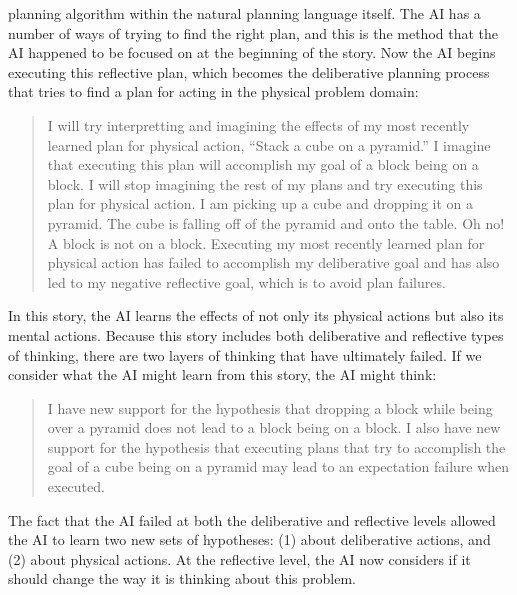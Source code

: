 planning algorithm within the natural planning language itself.  The
AI has a number of ways of trying to find the right plan, and this is
the method that the AI happened to be focused on at the beginning of
the story.  Now the AI begins executing this reflective plan, which
becomes the deliberative planning process that tries to find a plan
for acting in the physical problem domain:
\begin{quote}
  I will try interpretting and imagining the effects of my most
  recently learned plan for physical action, ``Stack a cube on a
  pyramid.''  I imagine that executing this plan will accomplish my
  goal of a block being on a block.  I will stop imagining the rest of
  my plans and try executing this plan for physical action.  I am
  picking up a cube and dropping it on a pyramid.  The cube is falling
  off of the pyramid and onto the table.  Oh no!  A block is not on a
  block.  Executing my most recently learned plan for physical action
  has failed to accomplish my deliberative goal and has also led to my
  negative reflective goal, which is to avoid plan failures.
\end{quote}
In this story, the AI learns the effects of not only its physical
actions but also its mental actions.  Because this story includes both
deliberative and reflective types of thinking, there are two layers of
thinking that have ultimately failed.  If we consider what the AI
might learn from this story, the AI might think:
\begin{quote}
  I have new support for the hypothesis that dropping a block while
  being over a pyramid does not lead to a block being on a block.  I
  also have new support for the hypothesis that executing plans that
  try to accomplish the goal of a cube being on a pyramid may lead to
  an expectation failure when executed.
\end{quote}
The fact that the AI failed at both the deliberative and reflective
levels allowed the AI to learn two new sets of hypotheses: (1) about
deliberative actions, and (2) about physical actions.  At the
reflective level, the AI now considers if it should change the way it
is thinking about this problem.

